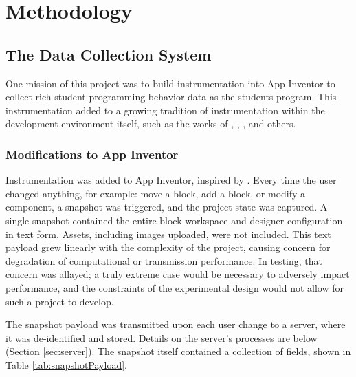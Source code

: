 \chapter{Methodology}

\section{The Data Collection System}
One mission of this project was to build instrumentation into App Inventor to collect rich student programming behavior data as the students program. This instrumentation added to a growing tradition of instrumentation within the development environment itself, such as the works of \citet{berland-2013}, \citet{piech-2012}, \citet{lipman-phd}, and others.

\subsection{Modifications to App Inventor}
Instrumentation was added to App Inventor, inspired by \citet{piech-2012}. Every time the user changed anything, for example: move a block, add a block, or modify a component, a snapshot was triggered, and the project state was captured. A single snapshot contained the entire block workspace and designer configuration in text form. Assets, including images uploaded, were not included. This text payload grew linearly with the complexity of the project, causing concern for degradation of computational or transmission performance. In testing, that concern was allayed; a truly extreme case would be necessary to adversely impact performance, and the constraints of the experimental design would not allow for such a project to develop.

The snapshot payload was transmitted upon each user change to a server, where it was de-identified and stored. Details on the server's processes are below (Section \ref{sec:server}). The snapshot itself contained a collection of fields, shown in Table \ref{tab:snapshotPayload}. 


